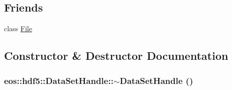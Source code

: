 \subsection*{Friends}
\begin{DoxyCompactItemize}
\item 
class \hyperlink{classeos_1_1hdf5_1_1DataSetHandle_a68d15876ad188b7628261b12d0eac8aa}{File}
\end{DoxyCompactItemize}


\subsection{Constructor \& Destructor Documentation}
\hypertarget{classeos_1_1hdf5_1_1DataSetHandle_a14a9f5a1e190657f26ca9eb9d6d582cd}{
\subsubsection[{$\sim$DataSetHandle}]{\setlength{\rightskip}{0pt plus 5cm}eos::hdf5::DataSetHandle::$\sim$DataSetHandle ()}}
\label{classeos_1_1hdf5_1_1DataSetHandle_a14a9f5a1e190657f26ca9eb9d6d582cd}


